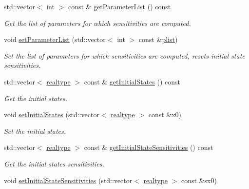 \begin{DoxyCompactItemize}
std\+::vector$<$ int $>$ const  \& \mbox{\hyperlink{classamici_1_1_model_a94b6dfdb4883c916627b287e4d7b9b44}{get\+Parameter\+List}} () const
\begin{DoxyCompactList}\small\item\em Get the list of parameters for which sensitivities are computed. \end{DoxyCompactList}\item 
void \mbox{\hyperlink{classamici_1_1_model_a2afe974183e4bccaf746f6409941fe8f}{set\+Parameter\+List}} (std\+::vector$<$ int $>$ const \&\mbox{\hyperlink{classamici_1_1_model_a6ac0de1b7dfddbb4a480657f62573563}{plist}})
\begin{DoxyCompactList}\small\item\em Set the list of parameters for which sensitivities are computed, resets initial state sensitivities. \end{DoxyCompactList}\item 
std\+::vector$<$ \mbox{\hyperlink{namespaceamici_a1bdce28051d6a53868f7ccbf5f2c14a3}{realtype}} $>$ const  \& \mbox{\hyperlink{classamici_1_1_model_a34b007de55db268995bdc788accdc57d}{get\+Initial\+States}} () const
\begin{DoxyCompactList}\small\item\em Get the initial states. \end{DoxyCompactList}\item 
void \mbox{\hyperlink{classamici_1_1_model_ada7cb3dadf4cee4b8fd6f092fee54b3c}{set\+Initial\+States}} (std\+::vector$<$ \mbox{\hyperlink{namespaceamici_a1bdce28051d6a53868f7ccbf5f2c14a3}{realtype}} $>$ const \&x0)
\begin{DoxyCompactList}\small\item\em Set the initial states. \end{DoxyCompactList}\item 
std\+::vector$<$ \mbox{\hyperlink{namespaceamici_a1bdce28051d6a53868f7ccbf5f2c14a3}{realtype}} $>$ const  \& \mbox{\hyperlink{classamici_1_1_model_a989b8202ceac7b6f94bb1503519a56fb}{get\+Initial\+State\+Sensitivities}} () const
\begin{DoxyCompactList}\small\item\em Get the initial states sensitivities. \end{DoxyCompactList}\item 
void \mbox{\hyperlink{classamici_1_1_model_a82941b121d9db31d357642092a2cd41d}{set\+Initial\+State\+Sensitivities}} (std\+::vector$<$ \mbox{\hyperlink{namespaceamici_a1bdce28051d6a53868f7ccbf5f2c14a3}{realtype}} $>$ const \&sx0)

\end{DoxyCompactItemize}
